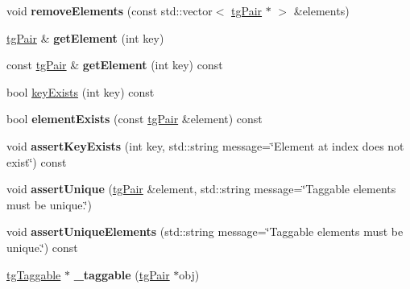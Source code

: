 \begin{DoxyCompactItemize}
\item 
\hypertarget{classtg_taggables_a83f364ebce003fbaad9672c7f5a50847}{void {\bfseries remove\-Elements} (const std\-::vector$<$ \hyperlink{classtg_pair}{tg\-Pair} $\ast$ $>$ \&elements)}\label{classtg_taggables_a83f364ebce003fbaad9672c7f5a50847}

\item 
\hypertarget{classtg_taggables_a579393f46ed07b0620987ebdcc50bd25}{\hyperlink{classtg_pair}{tg\-Pair} \& {\bfseries get\-Element} (int key)}\label{classtg_taggables_a579393f46ed07b0620987ebdcc50bd25}

\item 
\hypertarget{classtg_taggables_a35830f2d7f865f692f8abd529ba93d0f}{const \hyperlink{classtg_pair}{tg\-Pair} \& {\bfseries get\-Element} (int key) const}\label{classtg_taggables_a35830f2d7f865f692f8abd529ba93d0f}

\item 
bool \hyperlink{classtg_taggables_ac2922a09a3b3885c8f6f4d0c97b247a9}{key\-Exists} (int key) const
\item 
\hypertarget{classtg_taggables_a54045c97e415be9bc8422b0e100b6fee}{bool {\bfseries element\-Exists} (const \hyperlink{classtg_pair}{tg\-Pair} \&element) const}\label{classtg_taggables_a54045c97e415be9bc8422b0e100b6fee}

\item 
\hypertarget{classtg_taggables_aebe6b45ca9d42a229224616c54460161}{void {\bfseries assert\-Key\-Exists} (int key, std\-::string message=\char`\"{}Element at index does not exist\char`\"{}) const}\label{classtg_taggables_aebe6b45ca9d42a229224616c54460161}

\item 
\hypertarget{classtg_taggables_a2428d80a02f7344ac146710f1c4222d1}{void {\bfseries assert\-Unique} (\hyperlink{classtg_pair}{tg\-Pair} \&element, std\-::string message=\char`\"{}Taggable elements must be unique.\char`\"{})}\label{classtg_taggables_a2428d80a02f7344ac146710f1c4222d1}

\item 
\hypertarget{classtg_taggables_abb1aa6daab7d692173a9f9c2f84e39a7}{void {\bfseries assert\-Unique\-Elements} (std\-::string message=\char`\"{}Taggable elements must be unique.\char`\"{}) const}\label{classtg_taggables_abb1aa6daab7d692173a9f9c2f84e39a7}

\item 
\hypertarget{classtg_taggables_a0188b2313dad65b78fad978c6a25d015}{\hyperlink{classtg_taggable}{tg\-Taggable} $\ast$ {\bfseries \-\_\-taggable} (\hyperlink{classtg_pair}{tg\-Pair} $\ast$obj)}\label{classtg_taggables_a0188b2313dad65b78fad978c6a25d015}

\end{DoxyCompactItemize}


